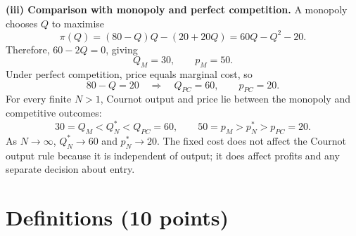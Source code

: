 \documentclass[11pt,a4paper]{article}
\begin{document}
\textbf{(iii) Comparison with monopoly and perfect competition.} A monopoly
chooses \(Q\) to maximise
\[
\pi(Q)=(80-Q)Q-(20+20Q)=60Q-Q^2-20.
\]
Therefore, \(60-2Q=0\), giving
\[
\boxed{Q_M=30,\qquad p_M=50.}
\]
Under perfect competition, price equals marginal cost, so
\[
80-Q=20
\quad\Longrightarrow\quad
\boxed{Q_{PC}=60,\qquad p_{PC}=20.}
\]
For every finite \(N>1\), Cournot output and price lie between the monopoly
and competitive outcomes:
\[
\boxed{30=Q_M<Q_N^*<Q_{PC}=60,\qquad
50=p_M>p_N^*>p_{PC}=20.}
\]
As \(N\to\infty\), \(Q_N^*\to60\) and \(p_N^*\to20\). The fixed cost
does not affect the Cournot output rule because it is independent of output;
it does affect profits and any separate decision about entry.

\section{Definitions \hfill (10 points)}
\end{document}
